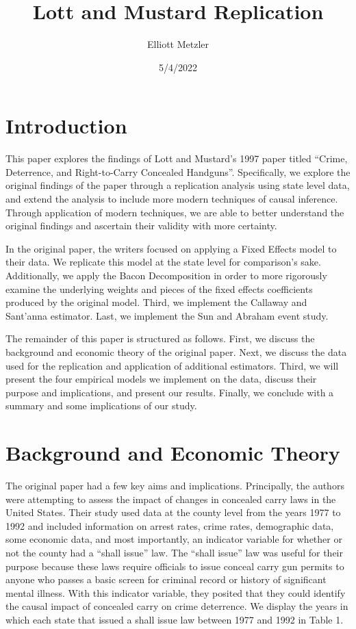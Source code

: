 \documentclass{article}
\author{Elliott Metzler}
\title{Lott and Mustard Replication}
\date{5/4/2022}
\begin{document}
\maketitle

\section{Introduction}

This paper explores the findings of Lott and Mustard's 1997 paper titled ``Crime, Deterrence, and Right-to-Carry Concealed Handguns''. Specifically, we explore the original findings of the paper through a replication analysis using state level data, and extend the analysis to include more modern techniques of causal inference. Through application of modern techniques, we are able to better understand the original findings and ascertain their validity with more certainty. 

In the original paper, the writers focused on applying a Fixed Effects model to their data. We replicate this model at the state level for comparison's sake. Additionally, we apply the Bacon Decomposition in order to more rigorously examine the underlying weights and pieces of the fixed effects coefficients produced by the original model. Third, we implement the Callaway and Sant'anna estimator. Last, we implement the Sun and Abraham event study. 

The remainder of this paper is structured as follows. First, we discuss the background and economic theory of the original paper. Next, we discuss the data used for the replication and application of additional estimators. Third, we will present the four empirical models we implement on the data, discuss their purpose and implications, and present our results. Finally, we conclude with a summary and some implications of our study.

\section{Background and Economic Theory}

The original paper had a few key aims and implications. Principally, the authors were attempting to assess the impact of changes in concealed carry laws in the United States. Their study used data at the county level from the years 1977 to 1992 and included information on arrest rates, crime rates, demographic data, some economic data, and most importantly, an indicator variable for whether or not the county had a ``shall issue'' law. The ``shall issue'' law was useful for their purpose because these laws require officials to issue conceal carry gun permits to anyone who passes a basic screen for criminal record or history of significant mental illness. With this indicator variable, they posited that they could identify the causal impact of concealed carry on crime deterrence. We display the years in which each state that issued a shall issue law between 1977 and 1992 in Table 1.
\end{document}
